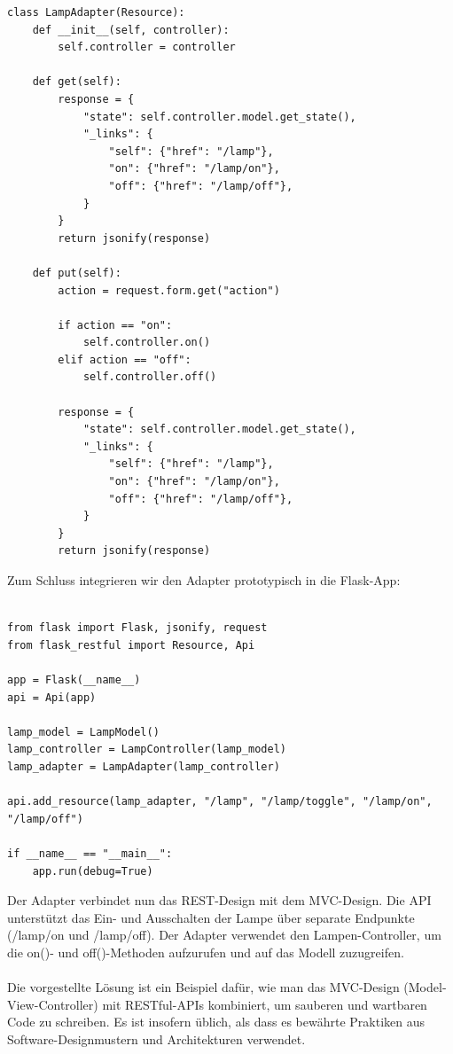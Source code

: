 \documentclass[../vs-script-first-v01.tex]{subfiles}
\begin{document}
\begin{lstlisting}[caption={LampAdapter},captionpos=b,label={lst:lamp_a}]
class LampAdapter(Resource):
    def __init__(self, controller):
        self.controller = controller

    def get(self):
        response = {
            "state": self.controller.model.get_state(),
            "_links": {
                "self": {"href": "/lamp"},
                "on": {"href": "/lamp/on"},
                "off": {"href": "/lamp/off"},
            }
        }
        return jsonify(response)

    def put(self):
        action = request.form.get("action")

        if action == "on":
            self.controller.on()
        elif action == "off":
            self.controller.off()

        response = {
            "state": self.controller.model.get_state(),
            "_links": {
                "self": {"href": "/lamp"},
                "on": {"href": "/lamp/on"},
                "off": {"href": "/lamp/off"},
            }
        }
        return jsonify(response)
\end{lstlisting}
Zum Schluss integrieren wir den Adapter prototypisch in die Flask-App:\\\\
\begin{lstlisting}[caption={Lamp REST APP},captionpos=b,label={lst:lamp_r}]
from flask import Flask, jsonify, request
from flask_restful import Resource, Api

app = Flask(__name__)
api = Api(app)

lamp_model = LampModel()
lamp_controller = LampController(lamp_model)
lamp_adapter = LampAdapter(lamp_controller)

api.add_resource(lamp_adapter, "/lamp", "/lamp/toggle", "/lamp/on", "/lamp/off")

if __name__ == "__main__":
    app.run(debug=True)
\end{lstlisting}
Der Adapter verbindet nun das REST-Design mit dem MVC-Design. Die API unterstützt das Ein- und Ausschalten der Lampe über separate Endpunkte (/lamp/on und /lamp/off). Der Adapter verwendet den Lampen-Controller, um die on()- und off()-Methoden aufzurufen und auf das Modell zuzugreifen.
\\\\
Die vorgestellte Lösung ist ein Beispiel dafür, wie man das MVC-Design (Model-View-Controller) mit RESTful-APIs kombiniert, um sauberen und wartbaren Code zu schreiben. Es ist insofern üblich, als dass es bewährte Praktiken aus Software-Designmustern und Architekturen verwendet.
\end{document}
